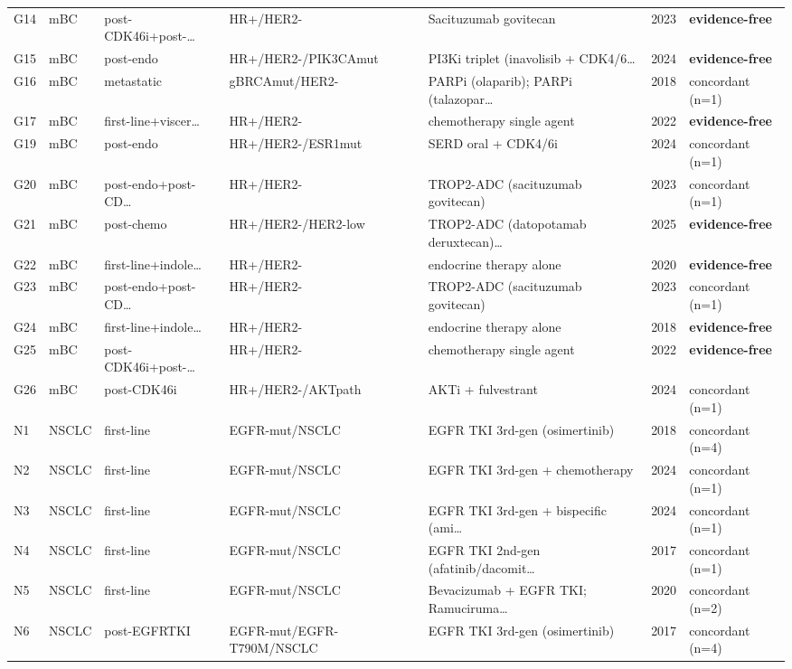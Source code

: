 \begin{table}[H]
\begin{tabular}{@{}p{}p{}p{}p{}p{}p{}p{}@{}}
G14 & mBC & post-CDK46i+post-… & HR+/HER2- & Sacituzumab govitecan & 2023 & \textbf{evidence-free} \\
G15 & mBC & post-endo & HR+/HER2-/PIK3CAmut & PI3Ki triplet (inavolisib + CDK4/6… & 2024 & \textbf{evidence-free} \\
G16 & mBC & metastatic & gBRCAmut/HER2- & PARPi (olaparib); PARPi (talazopar… & 2018 & concordant (n=1) \\
G17 & mBC & first-line+viscer… & HR+/HER2- & chemotherapy single agent & 2022 & \textbf{evidence-free} \\
G19 & mBC & post-endo & HR+/HER2-/ESR1mut & SERD oral + CDK4/6i & 2024 & concordant (n=1) \\
G20 & mBC & post-endo+post-CD… & HR+/HER2- & TROP2-ADC (sacituzumab govitecan) & 2023 & concordant (n=1) \\
G21 & mBC & post-chemo & HR+/HER2-/HER2-low & TROP2-ADC (datopotamab deruxtecan)… & 2025 & \textbf{evidence-free} \\
G22 & mBC & first-line+indole… & HR+/HER2- & endocrine therapy alone & 2020 & \textbf{evidence-free} \\
G23 & mBC & post-endo+post-CD… & HR+/HER2- & TROP2-ADC (sacituzumab govitecan) & 2023 & concordant (n=1) \\
G24 & mBC & first-line+indole… & HR+/HER2- & endocrine therapy alone & 2018 & \textbf{evidence-free} \\
G25 & mBC & post-CDK46i+post-… & HR+/HER2- & chemotherapy single agent & 2022 & \textbf{evidence-free} \\
G26 & mBC & post-CDK46i & HR+/HER2-/AKTpath & AKTi + fulvestrant & 2024 & concordant (n=1) \\
N1 & NSCLC & first-line & EGFR-mut/NSCLC & EGFR TKI 3rd-gen (osimertinib) & 2018 & concordant (n=4) \\
N2 & NSCLC & first-line & EGFR-mut/NSCLC & EGFR TKI 3rd-gen + chemotherapy & 2024 & concordant (n=1) \\
N3 & NSCLC & first-line & EGFR-mut/NSCLC & EGFR TKI 3rd-gen + bispecific (ami… & 2024 & concordant (n=1) \\
N4 & NSCLC & first-line & EGFR-mut/NSCLC & EGFR TKI 2nd-gen (afatinib/dacomit… & 2017 & concordant (n=1) \\
N5 & NSCLC & first-line & EGFR-mut/NSCLC & Bevacizumab + EGFR TKI; Ramuciruma… & 2020 & concordant (n=2) \\
N6 & NSCLC & post-EGFRTKI & EGFR-mut/EGFR-T790M/NSCLC & EGFR TKI 3rd-gen (osimertinib) & 2017 & concordant (n=4) \\

\end{tabular}
\end{table}
